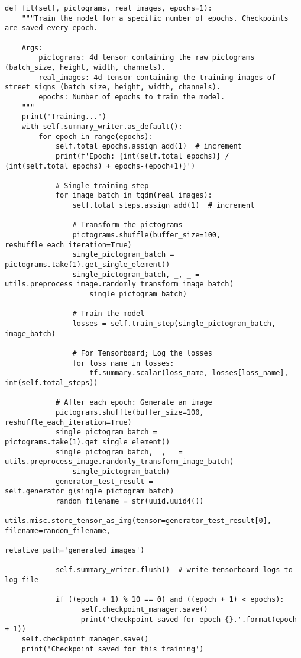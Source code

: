 \begin{code}
  \begin{verbatim}
def fit(self, pictograms, real_images, epochs=1):
    """Train the model for a specific number of epochs. Checkpoints are saved every epoch.

    Args:
        pictograms: 4d tensor containing the raw pictograms (batch_size, height, width, channels).
        real_images: 4d tensor containing the training images of street signs (batch_size, height, width, channels).
        epochs: Number of epochs to train the model.
    """
    print('Training...')
    with self.summary_writer.as_default():
        for epoch in range(epochs):
            self.total_epochs.assign_add(1)  # increment
            print(f'Epoch: {int(self.total_epochs)} / {int(self.total_epochs) + epochs-(epoch+1)}')

            # Single training step
            for image_batch in tqdm(real_images):
                self.total_steps.assign_add(1)  # increment

                # Transform the pictograms
                pictograms.shuffle(buffer_size=100, reshuffle_each_iteration=True)
                single_pictogram_batch = pictograms.take(1).get_single_element()
                single_pictogram_batch, _, _ = utils.preprocess_image.randomly_transform_image_batch(
                    single_pictogram_batch)

                # Train the model
                losses = self.train_step(single_pictogram_batch, image_batch)

                # For Tensorboard; Log the losses
                for loss_name in losses:
                    tf.summary.scalar(loss_name, losses[loss_name], int(self.total_steps))

            # After each epoch: Generate an image
            pictograms.shuffle(buffer_size=100, reshuffle_each_iteration=True)
            single_pictogram_batch = pictograms.take(1).get_single_element()
            single_pictogram_batch, _, _ = utils.preprocess_image.randomly_transform_image_batch(
                single_pictogram_batch)
            generator_test_result = self.generator_g(single_pictogram_batch)
            random_filename = str(uuid.uuid4())
            utils.misc.store_tensor_as_img(tensor=generator_test_result[0], filename=random_filename,
                                            relative_path='generated_images')
            
            self.summary_writer.flush()  # write tensorboard logs to log file

            if ((epoch + 1) % 10 == 0) and ((epoch + 1) < epochs):
                  self.checkpoint_manager.save()
                  print('Checkpoint saved for epoch {}.'.format(epoch + 1))
    self.checkpoint_manager.save()
    print('Checkpoint saved for this training')
    
\end{verbatim}
  \label{lst:fit-full}
  \end{code}



